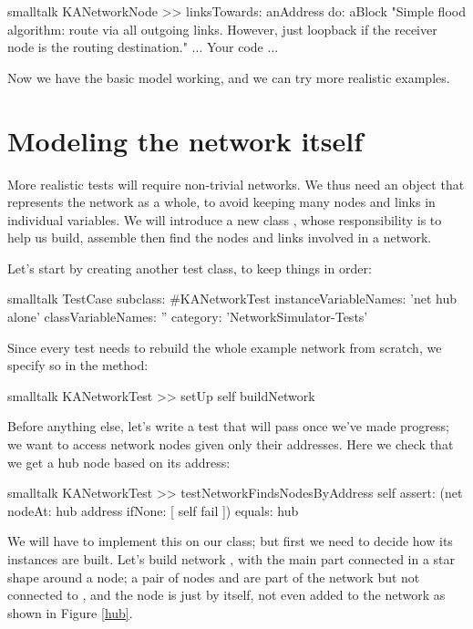 \documentclass[10pt,twoside,english]{_support/latex/sbabook/sbabook}
\begin{document}
\begin{displaycode}{smalltalk}
KANetworkNode >> linksTowards: anAddress do: aBlock
    "Simple flood algorithm: route via all outgoing links.
    However, just loopback if the receiver node is the routing destination."
    ... Your code ...
\end{displaycode}

Now we have the basic model working, and we can try more realistic examples.
\section{Modeling the network itself}
More realistic tests will require non-trivial networks.
We thus need an object that represents the network as a whole, to avoid keeping many nodes and links in individual variables.
We will introduce a new class , whose responsibility is to help us build, assemble then find the nodes and links involved in a network.

Let's start by creating another test class, to keep things in order:

\begin{displaycode}{smalltalk}
TestCase subclass: #KANetworkTest
    instanceVariableNames: 'net hub alone'
    classVariableNames: ''
    category: 'NetworkSimulator-Tests'
\end{displaycode}

Since every test needs to rebuild the whole example network from scratch, we specify so in the  method:

\begin{displaycode}{smalltalk}
KANetworkTest >> setUp
    self buildNetwork
\end{displaycode}

Before anything else, let's write a test that will pass once we've made progress; we want to access network nodes given only their addresses. Here we check that we get a hub node based on its address: 

\begin{displaycode}{smalltalk}
KANetworkTest >> testNetworkFindsNodesByAddress
    self
        assert: (net nodeAt: hub address ifNone: [ self fail ])
        equals: hub
\end{displaycode}

We will have to implement this  on our  class; but first we need to decide how its instances are built.
Let's build network , with the main part connected in a star shape around a  node; a pair of nodes  and  are part of the network but not connected to , and the  node is just by itself, not even added to the network as shown in Figure \ref{hub}.
\end{document}
